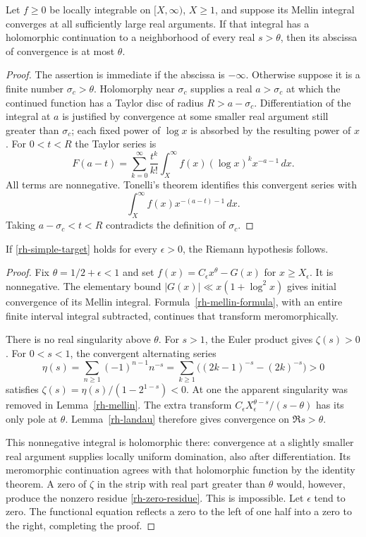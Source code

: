 \begin{lemma}
\label{rh-landau}
Let $f\ge0$ be locally integrable on $[X,\infty)$, $X\ge1$, and
suppose its Mellin integral converges at all sufficiently large real
arguments. If that integral has a holomorphic continuation to a
neighborhood of every real $s>\theta$, then its abscissa of
convergence is at most $\theta$.
\end{lemma}

\begin{proof}
The assertion is immediate if the abscissa is $-\infty$. Otherwise
suppose it is a finite number $\sigma_c>\theta$. Holomorphy near
$\sigma_c$ supplies a real $a>\sigma_c$ at which the continued
function has a Taylor disc of radius $R>a-\sigma_c$.
Differentiation of the integral at $a$ is justified by convergence at
some smaller real argument still greater than $\sigma_c$; each fixed
power of $\log x$ is absorbed by the resulting power of $x$.
For $0<t<R$ the Taylor series is
\[
 F(a-t)=\sum_{k=0}^\infty\frac{t^k}{k!}
              \int_X^\infty f(x)(\log x)^kx^{-a-1}\,dx.
\]
All terms are nonnegative. Tonelli's theorem identifies this convergent
series with
\[
                         \int_X^\infty f(x)x^{-(a-t)-1}\,dx.
\]
Taking $a-\sigma_c<t<R$ contradicts the definition of $\sigma_c$.
\end{proof}

\begin{theorem}
\label{rh-eventual}
If \eqref{rh-simple-target} holds for every $\epsilon>0$, the
Riemann hypothesis follows.
\end{theorem}

\begin{proof}
Fix $\theta=1/2+\epsilon<1$ and set
$f(x)=C_\epsilon x^\theta-G(x)$ for $x\ge X_\epsilon$.
It is nonnegative. The elementary bound
$|G(x)|\ll x(1+\log^2x)$ gives initial convergence of its Mellin
integral. Formula~\eqref{rh-mellin-formula}, with an entire finite
interval integral subtracted, continues that transform meromorphically.

There is no real singularity above $\theta$. For $s>1$, the Euler
product gives $\zeta(s)>0$. For $0<s<1$, the convergent alternating
series
\[
 \eta(s)=\sum_{n\ge1}(-1)^{n-1}n^{-s}
        =\sum_{k\ge1}\bigl((2k-1)^{-s}-(2k)^{-s}\bigr)>0
\]
satisfies $\zeta(s)=\eta(s)/(1-2^{1-s})<0$. At one the apparent
singularity was removed in Lemma~\ref{rh-mellin}. The extra transform
$C_\epsilon X_\epsilon^{\theta-s}/(s-\theta)$ has its only pole at
$\theta$. Lemma~\ref{rh-landau} therefore gives convergence on
$\Re s>\theta$.

This nonnegative integral is holomorphic there: convergence at a
slightly smaller real argument supplies locally uniform domination,
also after differentiation. Its meromorphic continuation agrees with
that holomorphic function by the identity theorem. A zero of $\zeta$
in the strip with real part greater than $\theta$ would, however,
produce the nonzero residue \eqref{rh-zero-residue}. This is impossible.
Let $\epsilon$ tend to zero. The functional equation reflects a zero
to the left of one half into a zero to the right, completing the proof.
\end{proof}

